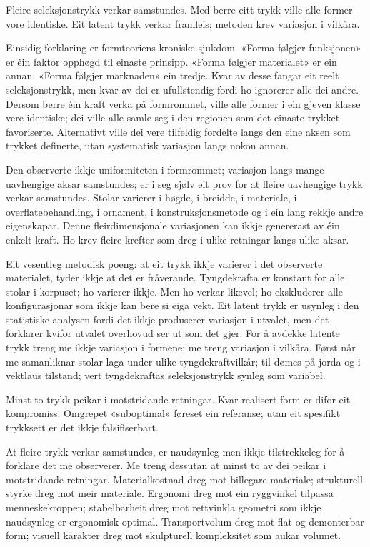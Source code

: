 Fleire seleksjonstrykk verkar samstundes. Med berre eitt trykk ville alle former vore identiske. Eit latent trykk verkar framleis; metoden krev variasjon i vilkåra.

Einsidig forklaring er formteoriens kroniske sjukdom. «Forma følgjer funksjonen» er éin faktor opphøgd til einaste prinsipp. «Forma følgjer materialet» er ein annan. «Forma følgjer marknaden» ein tredje. Kvar av desse fangar eit reelt seleksjonstrykk, men kvar av dei er ufullstendig fordi ho ignorerer alle dei andre. Dersom berre éin kraft verka på formrommet, ville alle former i ein gjeven klasse vere identiske; dei ville alle samle seg i den regionen som det einaste trykket favoriserte. Alternativt ville dei vere tilfeldig fordelte langs den eine aksen som trykket definerte, utan systematisk variasjon langs nokon annan.

Den observerte ikkje-uniformiteten i formrommet; variasjon langs mange uavhengige aksar samstundes; er i seg sjølv eit prov for at fleire uavhengige trykk verkar samstundes. Stolar varierer i høgde, i breidde, i materiale, i overflatebehandling, i ornament, i konstruksjonsmetode og i ein lang rekkje andre eigenskapar. Denne fleirdimensjonale variasjonen kan ikkje genererast av éin enkelt kraft. Ho krev fleire krefter som dreg i ulike retningar langs ulike aksar.

Eit vesentleg metodisk poeng: at eit trykk ikkje varierer i det observerte materialet, tyder ikkje at det er fråverande. Tyngdekrafta er konstant for alle stolar i korpuset; ho varierer ikkje. Men ho verkar likevel; ho ekskluderer alle konfigurasjonar som ikkje kan bere si eiga vekt. Eit latent trykk er usynleg i den statistiske analysen fordi det ikkje produserer variasjon i utvalet, men det forklarer kvifor utvalet overhovud ser ut som det gjer. For å avdekke latente trykk treng me ikkje variasjon i formene; me treng variasjon i vilkåra. Først når me samanliknar stolar laga under ulike tyngdekraftvilkår; til dømes på jorda og i vektlaus tilstand; vert tyngdekraftas seleksjonstrykk synleg som variabel.

Minst to trykk peikar i motstridande retningar. Kvar realisert form er difor eit kompromiss. Omgrepet «suboptimal» føreset ein referanse; utan eit spesifikt trykksett er det ikkje falsifiserbart.

At fleire trykk verkar samstundes, er naudsynleg men ikkje tilstrekkeleg for å forklare det me observerer. Me treng dessutan at minst to av dei peikar i motstridande retningar. Materialkostnad dreg mot billegare materiale; strukturell styrke dreg mot meir materiale. Ergonomi dreg mot ein ryggvinkel tilpassa menneskekroppen; stabelbarheit dreg mot rettvinkla geometri som ikkje naudsynleg er ergonomisk optimal. Transportvolum dreg mot flat og demonterbar form; visuell karakter dreg mot skulpturell kompleksitet som aukar volumet.

